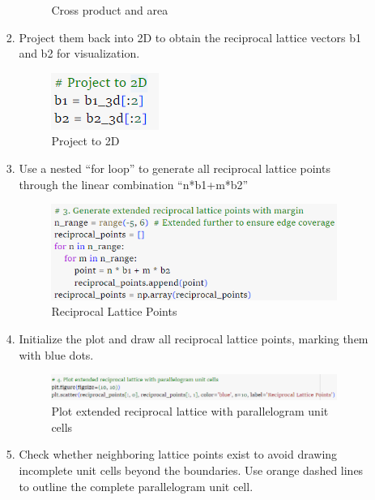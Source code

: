 \documentclass[12pt,a4paper]{article}
\begin{document}
\begin{CJK}{UTF8}{bkai}
\begin{enumerate}
\begin{enumerate}
\begin{enumerate}
\begin{figure}[h]
                \caption{Cross product and area}
                \label{fig:result_2_2_3}
            \end{figure}
            \clearpage
            \item Project them back into 2D to obtain the reciprocal lattice vectors b1 and b2 for visualization.
            \begin{figure}[h]
                \centering
                \includegraphics[width=0.3\linewidth]{figures/result_2_2_4.png}
                \caption{Project to 2D}
                \label{fig:result_2_2_4}
            \end{figure}
            \item Use a nested “for loop”  to generate all reciprocal lattice points through the linear combination “n*b1+m*b2”
            \begin{figure}[h]
                \centering
                \includegraphics[width=0.7\linewidth]{figures/result_2_2_5.png}
                \caption{Reciprocal Lattice Points}
                \label{fig:result_2_2_5}
            \end{figure}
            \item Initialize the plot and draw all reciprocal lattice points, marking them with blue dots.
            \begin{figure}[h]
                \centering
                \includegraphics[width=0.7\linewidth]{figures/result_2_2_6.png}
                \caption{Plot extended reciprocal lattice with parallelogram unit cells}
                \label{fig:result_2_2_6}
            \end{figure}
            \clearpage
            \item Check whether neighboring lattice points exist to avoid drawing incomplete unit cells beyond the boundaries. Use orange dashed lines to outline the complete parallelogram unit cell.

\end{enumerate}
\end{enumerate}
\end{enumerate}
\end{CJK}
\end{document}
